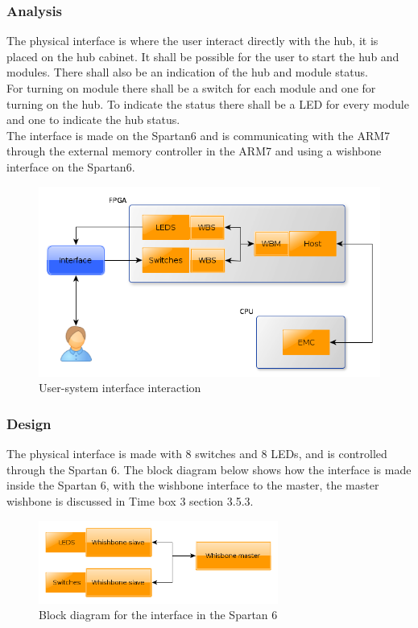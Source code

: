 \subsubsection{Analysis}
The physical interface is where the user interact directly with the hub, it is placed on the hub cabinet. It shall be possible for the user to start the hub and modules. There shall also be an indication of the hub and module status.\\
For turning on module there shall be a switch for each module and one for turning on the hub. To indicate the status there shall be a LED for every module and one to indicate the hub status.\\
The interface is made on the Spartan6 and is communicating with the ARM7 through the external memory controller in the ARM7 and using a wishbone interface on the Spartan6.
\begin{figure}[H]
	\begin{centering}
		\includegraphics[width=1.0\textwidth]{images/analysis_phy_interface.png}
		\caption{User-system interface interaction}
	\end{centering}
\end{figure}
\subsubsection{Design}
The physical interface is made with 8 switches and 8 LEDs, and is controlled through the Spartan 6. The block diagram below shows how the interface is made inside the Spartan 6, with the wishbone interface to the master, the master wishbone is discussed in Time box 3 section 3.5.3.
\begin{figure}[H]
	\begin{centering}
			\includegraphics[width=0.7\textwidth]{images/Design_HWmodule.png}
			\caption{Block diagram for the interface in the Spartan 6}
	\end{centering}
\end{figure}

